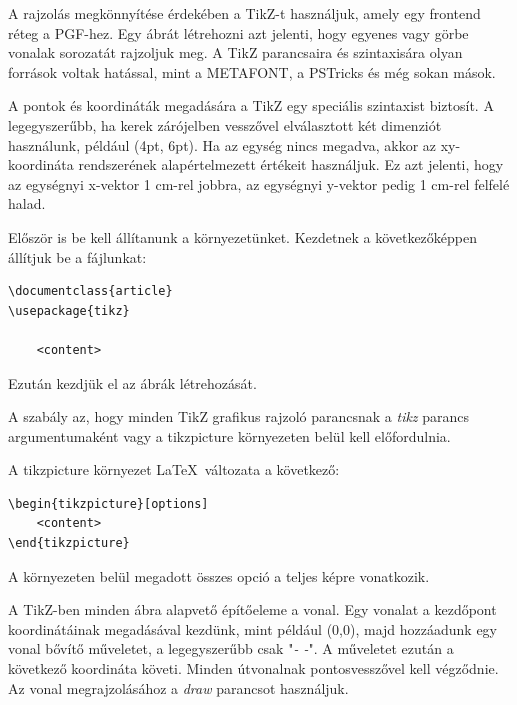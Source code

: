 


A rajzolás megkönnyítése érdekében a TikZ-t használjuk, amely egy frontend réteg a PGF-hez. Egy ábrát létrehozni azt jelenti, hogy egyenes vagy görbe vonalak sorozatát rajzoljuk meg. A TikZ parancsaira és szintaxisára olyan források voltak hatással, mint a METAFONT, a PSTricks és még sokan mások.

A pontok és koordináták megadására a TikZ egy speciális szintaxist biztosít. A legegyszerűbb, ha kerek zárójelben vesszővel elválasztott két dimenziót használunk, például (4pt, 6pt). Ha az egység nincs megadva, akkor az xy-koordináta rendszerének alapértelmezett értékeit használjuk. Ez azt jelenti, hogy az egységnyi x-vektor 1 cm-rel jobbra, az egységnyi y-vektor pedig 1 cm-rel felfelé halad. 



Először is be kell állítanunk a környezetünket. Kezdetnek a következőképpen állítjuk be a fájlunkat:

\begin{lstlisting}[style=latex]
\documentclass{article}
\usepackage{tikz}

    <content>

\end{lstlisting}

Ezután kezdjük el az ábrák létrehozását. 



A szabály az, hogy minden TikZ grafikus rajzoló parancsnak a \textit{tikz} parancs argumentumaként vagy a {tikzpicture} környezeten belül kell előfordulnia. 

A {tikzpicture} környezet \LaTeX\ változata a következő:

\begin{lstlisting}[style=latex]
\begin{tikzpicture}[options]
    <content>
\end{tikzpicture}
\end{lstlisting}


A környezeten belül megadott összes opció a teljes képre vonatkozik.

A TikZ-ben minden ábra alapvető építőeleme a vonal. Egy vonalat a kezdőpont koordinátáinak megadásával kezdünk, mint például (0,0), majd hozzáadunk egy vonal bővítő műveletet, a legegyszerűbb csak "\textit{- -}". A műveletet ezután a következő koordináta követi. Minden útvonalnak pontosvesszővel kell végződnie. Az vonal megrajzolásához a \textit{draw} parancsot használjuk.


